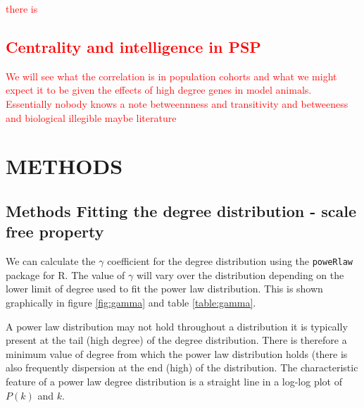 \textcolor{red}{there is\subsection{Centrality and intelligence in PSP}
We will see what the correlation is in population cohorts and what we might expect it to be given the effects of high degree genes in model animals. Essentially nobody knows 
 a note betweennness and transitivity and betweeness and biological illegible maybe literature}
 







\section{METHODS}

\subsection{Methods Fitting the degree distribution - scale free property}

We can calculate the $\gamma$ coefficient for the degree distribution using the \texttt{poweRlaw} package for R. The value of $\gamma$ will vary over the distribution depending on the lower limit of degree used to fit the power law distribution. This is shown graphically in figure \ref{fig:gamma} and table \ref{table:gamma}.

A power law distribution may not hold throughout a distribution it is typically present at the tail (high degree) of the degree distribution. There is therefore a minimum value of degree from which the power law distribution holds (there is also frequently dispersion at the end (high) of the distribution. The characteristic feature of a power law degree distribution is a straight line in a log-log plot of $ P(k)$ and $k$.

